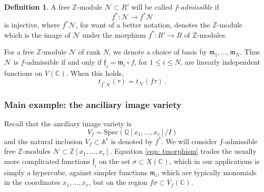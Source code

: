 \documentclass[a4paper,10pt]{amsart}
\theoremstyle{definition}
\newtheorem{defn}[thm]{Definition}
\theoremstyle{remark}
\newtheorem{rem}[thm]{Remark}
\numberwithin{equation}{section}
\newcommand{\To}{\longrightarrow}
\newcommand{\Z}{\mathbb Z}
\newcommand{\Q}{\mathbb Q}
\newcommand{\C}{\mathbb C}
\newcommand{\m}{\mathfrak{m}}
\newcommand{\Or}{\mathcal{O}}
\newcommand{\ff}{\mathfrak{f}}
\newcommand{\0}{\color{blue}{\mathsf{0}}}
\begin{document}
   \begin{defn}
 A  free $\Z$-module $\mathcal{N} \subset R'$ 
    will be called $f$-\emph{admissible} if       \[ f^*: \mathcal{N} \To f^{*} \mathcal{N} \]
    is injective, where $f^* \mathcal{N}$, for want of a better notation,  denotes the $\Z$-module which is the image of $\mathcal{N}$ under the morphism $f^*: R' \rightarrow R$ of $\Z$-modules. 
    \end{defn}
    For a free  $\Z$-module $\mathcal{N}$ of rank $N$, we denote a choice of  basis by $\m_1,\ldots, \m_N$. 
    Thus $\mathcal{N}$ is $f$-admissible if and only if   $\ff_i =  \m_i \circ f$, for $1\leq i \leq N$, are linearly independent functions on  $V(\C)$. 
    When this holds,
  \begin{equation} \label{eqn: tmorphism} 
  t_{f^*\mathcal{N}} (\tau) =  t_{\mathcal{N}}( f \tau )\ .
  \end{equation} 
  
  
   \subsubsection{Main example: the anciliary image variety}
    Recall  that the anciliary image variety is 
  \[ V_f = \mathrm{Spec}\left( \Q[x_1,\ldots, x_r] / I \right) \]
and the natural inclusion $V_f \subset \mathbb{A}^r$ is denoted by $f^*$. We will consider  $f$-admissible free $\Z$-modules $\mathcal{N} \subset \Z[x_1,\ldots, x_r]$. Equation  
 \eqref{eqn: tmorphism}  trades the usually more complicated functions $\ff_i$ on the set $\sigma\subset X(\C)$, which in our applications is simply a hypercube, against simpler functions $\m_i$, which are typically monomials in the coordinates $x_1,\ldots, x_r$,  but on the region $f \sigma \subset V_f(\C)$.

  
  
\end{document}

